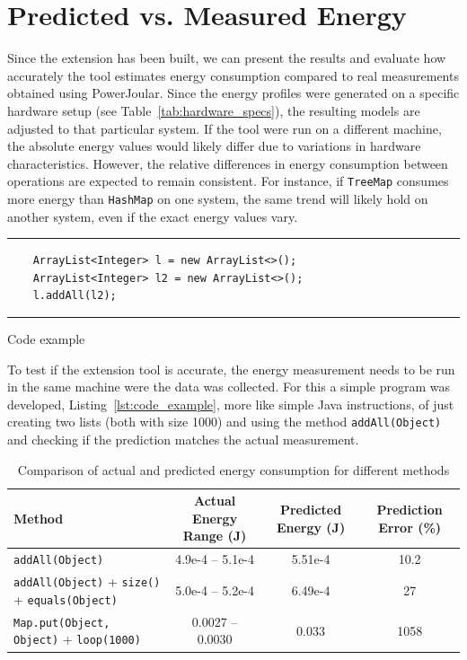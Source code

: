 \section{Predicted vs. Measured Energy} \label{sec:predicted_vs_measured_energy}

Since the extension has been built, we can present the results and evaluate how accurately the tool estimates energy consumption compared to real measurements obtained using PowerJoular. Since the energy profiles were generated on a specific hardware setup (see Table~\ref{tab:hardware_specs}), the resulting models are adjusted to that particular system. If the tool were run on a different machine, the absolute energy values would likely differ due to variations in hardware characteristics. However, the relative differences in energy consumption between operations are expected to remain consistent. For instance, if \texttt{TreeMap} consumes more energy than \texttt{HashMap} on one system, the same trend will likely hold on another system, even if the exact energy values vary.

\begin{listing}[H]
\noindent\rule{\linewidth}{0.4pt}
\begin{verbatim}
    ArrayList<Integer> l = new ArrayList<>();
    ArrayList<Integer> l2 = new ArrayList<>();
    l.addAll(l2);
\end{verbatim}
\noindent\rule{\linewidth}{0.4pt}
\caption{Code example}            
\label{lst:code_example}
\end{listing}

To test if the extension tool is accurate, the energy measurement needs to be run in the same machine were the data was collected.
For this a simple program was developed, Listing~\ref{lst:code_example}, more like simple Java instructions, of just creating two lists (both with size 1000) and using the method \texttt{addAll(Object)} and checking if the prediction matches the actual measurement.

\begin{table}[htbp]
  \centering
  \label{tab:energy_comparison}
  \footnotesize
  \begin{tabular}{>{\raggedright\arraybackslash}p{4cm}ccc}
    \toprule
    Method & Actual Energy Range (J) & Predicted Energy (J) & Prediction Error (\%) \\
    \midrule
    \texttt{addAll(Object)} & 4.9e-4 -- 5.1e-4 & 5.51e-4 & 10.2 \\
    \midrule
    \texttt{addAll(Object)} + \texttt{size()} + \texttt{equals(Object)} & 5.0e-4 -- 5.2e-4 & 6.49e-4 & 27 \\
    \midrule
    \texttt{Map.put(Object, Object)} + \texttt{loop(1000)} & 0.0027 -- 0.0030 & 0.033 &  1058 \\
    \bottomrule
  \end{tabular}
  \vspace{0.5em}
  \caption{Comparison of actual and predicted energy consumption for different methods}
\end{table}


